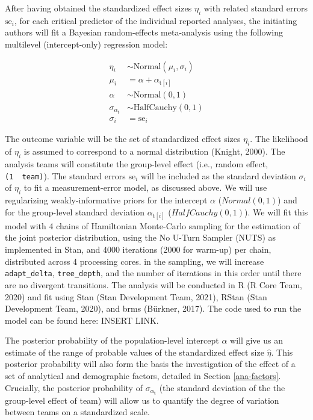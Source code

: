 \documentclass[
  english,
  man,floatsintext]{apa6}
\begin{document}
After having obtained the standardized effect sizes \(\eta_i\) with related standard errors \(\text{se}_i\), for each critical predictor of the individual reported analyses, the initiating authors will fit a Bayesian random-effects meta-analysis using the following multilevel (intercept-only) regression model:

\[
\begin{aligned}
\eta_i      & \sim \text{Normal}(\mu_i, \sigma_i) \\
\mu_i       & = \alpha + \alpha_{\text{t}[i]} \\
\alpha      & \sim \text{Normal}(0, 1) \\
\sigma_{\alpha_{\text{t}}} & \sim \text{HalfCauchy}(0, 1) \\
\sigma_i    & = \text{se}_i
\end{aligned}
\]

The outcome variable will be the set of standardized effect sizes \(\eta_i\).
The likelihood of \(\eta_i\) is assumed to correspond to a normal distribution (Knight, 2000).
The analysis teams will constitute the group-level effect (i.e., random effect, \texttt{(1\ \textbar{}\ team)}).
The standard errors \(\text{se}_i\) will be included as the standard deviation \(\sigma_i\) of \(\eta_i\) to fit a measurement-error model, as discussed above.
We will use regularizing weakly-informative priors for the intercept \(\alpha\) (\(Normal(0, 1)\)) and for the group-level standard deviation \(\alpha_{\text{t}[i]}\) (\(HalfCauchy(0, 1)\)).
We will fit this model with 4 chains of Hamiltonian Monte-Carlo sampling for the estimation of the joint posterior distribution, using the No U-Turn Sampler (NUTS) as implemented in Stan, and 4000 iterations (2000 for warm-up) per chain, distributed across 4 processing cores.
 in the sampling, we will increase \texttt{adapt\_delta}, \texttt{tree\_depth}, and the number of iterations in this order until there are no divergent transitions.
The analysis will be conducted in R (R Core Team, 2020) and fit using Stan (Stan Development Team, 2021), RStan (Stan Development Team, 2020), and brms (Bürkner, 2017).
The code used to run the model can be found here: INSERT LINK.

The posterior probability of the population-level intercept \(\alpha\) will give us an estimate of the range of probable values of the standardized effect size \(\hat{\eta}\).
This posterior probability will also form the basis  the investigation of the effect of a set of analytical and demographic factors, detailed in Section \ref{ana-factors}.
Crucially, the posterior probability of \(\sigma_{\alpha_{\text{t}}}\) (the standard deviation of the the group-level effect of team) will allow us to quantify the degree of variation between teams on a standardized scale.
\end{document}
